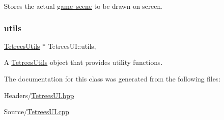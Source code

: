 Stores the actual \mbox{\hyperlink{classTetreesEngine_aeade477c0bc2eaaa894ebbdaca93584e}{game scene}} to be drawn on screen. \mbox{\label{classTetreesUI_a80545840b2848938d01d7f85786ee141}} 
\subsubsection{\texorpdfstring{utils}{utils}}
{\footnotesize\ttfamily \mbox{\hyperlink{classTetreesUtils}{Tetrees\+Utils}} $\ast$ Tetrees\+U\+I\+::utils\hspace{0.3cm}{\ttfamily [static]}, {\ttfamily [private]}}

A \mbox{\hyperlink{classTetreesUtils}{Tetrees\+Utils}} object that provides utility functions. 

The documentation for this class was generated from the following files\+:\begin{DoxyCompactItemize}
\item 
Headers/\mbox{\hyperlink{TetreesUI_8hpp}{Tetrees\+U\+I.\+hpp}}\item 
Source/\mbox{\hyperlink{TetreesUI_8cpp}{Tetrees\+U\+I.\+cpp}}\end{DoxyCompactItemize}
